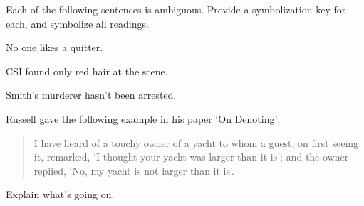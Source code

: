 \practiceproblems
\problempart
Each of the following sentences is ambiguous. Provide a symbolization key for each, and symbolize all readings.
\begin{earg}
	\item No one likes a quitter.
	\item CSI found only red hair at the scene.
	\item Smith's murderer hasn't been arrested.
\end{earg}

\problempart
Russell gave the following example in his paper `On Denoting':
\begin{quote}
	I have heard of a touchy owner of a yacht to whom a guest, on first seeing it, remarked, `I thought your yacht was larger than it is'; and the owner replied, `No, my yacht is not larger than it is'.
\end{quote}
Explain what's going on.
